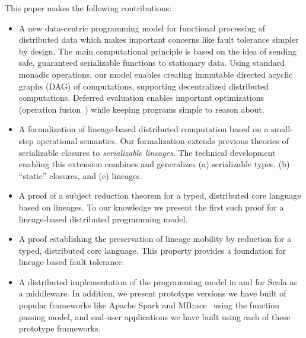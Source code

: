 \documentclass{jfp1}
\begin{document}
This paper makes the following contributions:
\begin{itemize}

  \item A new data-centric programming model for functional processing of
    distributed data which makes important concerns like fault tolerance simpler
    by design. The main computational principle is based on the idea of sending
    safe, guaranteed serializable functions to stationary data. Using standard
    monadic operations, our model enables creating immutable directed acyclic
    graphs (DAG) of computations, supporting decentralized distributed
    computations. Deferred evaluation enables important optimizations (operation
    fusion~\cite{FlumeJava}) while keeping programs simple to reason about.

  \item A formalization of lineage-based distributed computation based on a
    small-step operational semantics. Our formalization extends previous
    theories of serializable closures to {\em serializable lineages}. The
    technical development enabling this extension combines and generalizes (a)
    serializable types, (b) ``static'' closures, and (c) lineages.

  \item A proof of a subject reduction theorem for a typed, distributed core
    language based on lineages. To our knowledge we present the first such proof
    for a lineage-based distributed programming model.

  \item A proof establishing the preservation of lineage mobility by reduction
    for a typed, distributed core language. This property provides a foundation
    for lineage-based fault tolerance.

  \item A distributed implementation of the programming model in and for Scala
    as a middleware. In addition, we present prototype versions we have built of
    popular frameworks like Apache Spark and MBrace~\cite{MBrace} using the
    function passing model, and end-user applications we have built using each
    of these prototype frameworks.
  
\end{itemize}
\end{document}
